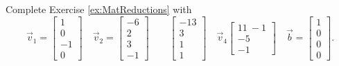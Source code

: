 \documentclass{ximera}
\begin{document}

\begin{exercise}
    Complete Exercise \ref{ex:MatReductions} with
    \begin{equation*}
        \vec{v}_1 = \begin{bmatrix} 1 \\ 0 \\ -1 \\ 0 \end{bmatrix} \quad \vec{v}_2 = \begin{bmatrix} -6 \\ 2 \\ 3 \\ -1 \end{bmatrix} \qquad \begin{bmatrix} -13 \\ 3 \\ 1 \\ 1 \end{bmatrix} \quad \vec{v}_4 \begin{bmatrix} 11 \ -1 \\ -5 \\ -1 \end{bmatrix} \quad \vec{b} = \begin{bmatrix} 1 \\ 0 \\ 0 \\ 0 \end{bmatrix}. 
    \end{equation*}
\end{exercise}
%
\end{document}
